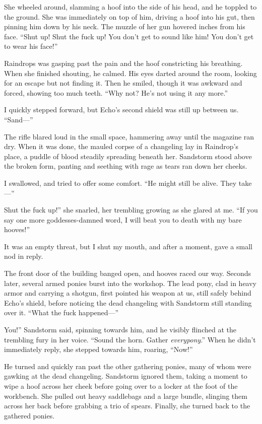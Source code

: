 She wheeled around, slamming a hoof into the side of his head, and he toppled to the ground. She was immediately on top of him, driving a hoof into his gut, then pinning him down by his neck. The muzzle of her gun hovered inches from his face. “Shut up! Shut the fuck up! You don’t get to sound like him! You don’t get to wear his face!”

Raindrops was gasping past the pain and the hoof constricting his breathing. When she finished shouting, he calmed. His eyes darted around the room, looking for an escape but not finding it. Then he smiled, though it was awkward and forced, showing too much teeth. “Why not? He’s not using it any more.”

I quickly stepped forward, but Echo’s second shield was still up between us. “Sand—”

The rifle blared loud in the small space, hammering away until the magazine ran dry. When it was done, the mauled corpse of a changeling lay in Raindrop’s place, a puddle of blood steadily spreading beneath her. Sandstorm stood above the broken form, panting and seething with rage as tears ran down her cheeks.

I swallowed, and tried to offer some comfort. “He might still be alive. They take—”

\leavevmode{}Shut the fuck up!” she snarled, her trembling growing as she glared at me. “If you say one more goddesses-damned word, I will beat you to death with my bare hooves!”

It was an empty threat, but I shut my mouth, and after a moment, gave a small nod in reply.

The front door of the building banged open, and hooves raced our way. Seconds later, several armed ponies burst into the workshop. The lead pony, clad in heavy armor and carrying a shotgun, first pointed his weapon at us, still safely behind Echo's shield, before noticing the dead changeling with Sandstorm still standing over it. “What the fuck happened—”

\leavevmode{}You!” Sandstorm said, spinning towards him, and he visibly flinched at the trembling fury in her voice. “Sound the horn. Gather \textit{everypony}.” When he didn’t immediately reply, she stepped towards him, roaring, “Now!”

He turned and quickly ran past the other gathering ponies, many of whom were gawking at the dead changeling. Sandstorm ignored them, taking a moment to wipe a hoof across her cheek before going over to a locker at the foot of the workbench. She pulled out heavy saddlebags and a large bundle, slinging them across her back before grabbing a trio of spears. Finally, she turned back to the gathered ponies.

